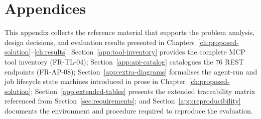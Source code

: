 \documentclass[a4paper,noexaminfo]{sapthesis}
\begin{document}
\appendix

\chapter*{Appendices}
\renewcommand{\thesection}{\Alph{section}}
\setcounter{section}{0}

\renewcommand{\thetable}{\thesection.\arabic{table}}
\renewcommand{\thefigure}{\thesection.\arabic{figure}}
\makeatletter
{}
\makeatother


This appendix collects the reference material that supports the
problem analysis, design decisions, and evaluation results presented in
Chapters~\ref{ch:proposed-solution}--\ref{ch:results}.
Section~\ref{app:tool-inventory} provides the complete MCP tool
inventory (FR-TL-04); Section~\ref{app:api-catalog} catalogues the
76 REST endpoints (FR-AP-08); Section~\ref{app:extra-diagrams}
formalises the agent-run and job lifecycle state machines introduced
in prose in Chapter~\ref{ch:proposed-solution};
Section~\ref{app:extended-tables} presents the extended traceability
matrix referenced from Section~\ref{sec:requirements}; and
Section~\ref{app:reproducibility} documents the environment and
procedure required to reproduce the evaluation.
\end{document}
